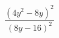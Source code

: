 \begin{ex}[type=expression]
	\begin{condition}
		\(\dfrac{(4y^2-8y)^2}{(8y-16)^2}\)
	\end{condition}
\end{ex}